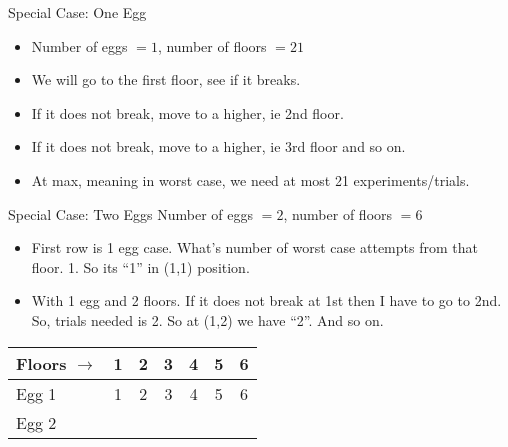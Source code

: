    \begin{frame}[fragile]{Special Case: One Egg}

\begin{itemize}
\item Number of eggs $= 1$, number of floors $= 21$

\item We will go to the first floor, see if it breaks.
\item If it does not break, move to a higher, ie 2nd floor.
\item If it does not break, move to a higher, ie 3rd floor and so on.
\item At max, meaning in worst case, we need at most 21 experiments/trials.
\end{itemize}

\end{frame}



   \begin{frame}[fragile]{Special Case: Two Eggs}
 Number of eggs $= 2$, number of floors $=6$
\begin{itemize}
\item First row is 1 egg case. What's number of worst case attempts from that floor. 1. So its ``1'' in (1,1) position.
\item With 1 egg and 2 floors. If it does not break at 1st then I have to go to 2nd. So, trials needed is 2. So at (1,2) we have ``2''. And so on.
\end{itemize}

 \begin{center}
 \begin{tabular}{|l|c|c|c|c|c|c|}
 \hline
Floors $\rightarrow$ & 1 &  2 &   3 &   4 & 5 &  6\\  \hline
Egg 1 & 1 & 2 & 3 & 4 & 5 & 6\\
Egg 2 \\
 \hline
 \end{tabular}
 \end{center}

\end{frame}


